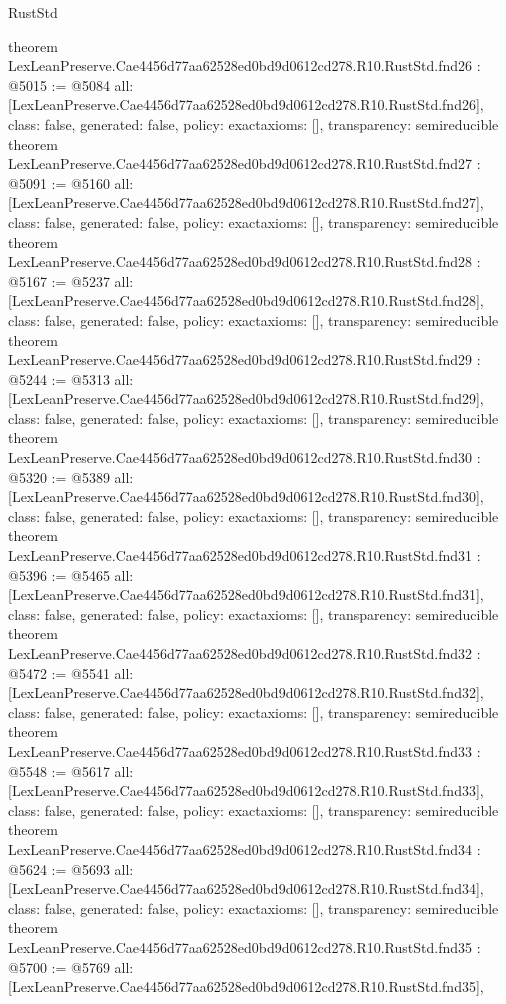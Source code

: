 \begin{lexlean}{RustStd}
\begin{coremodule}
{}
theorem LexLeanPreserve.Cae4456d77aa62528ed0bd9d0612cd278.R10.RustStd.fnd26 : @5015 := @5084 {
  all: [LexLeanPreserve.Cae4456d77aa62528ed0bd9d0612cd278.R10.RustStd.fnd26],
  class: false,
  generated: false,
  policy: exact{axioms: []},
  transparency: semireducible
}
theorem LexLeanPreserve.Cae4456d77aa62528ed0bd9d0612cd278.R10.RustStd.fnd27 : @5091 := @5160 {
  all: [LexLeanPreserve.Cae4456d77aa62528ed0bd9d0612cd278.R10.RustStd.fnd27],
  class: false,
  generated: false,
  policy: exact{axioms: []},
  transparency: semireducible
}
theorem LexLeanPreserve.Cae4456d77aa62528ed0bd9d0612cd278.R10.RustStd.fnd28 : @5167 := @5237 {
  all: [LexLeanPreserve.Cae4456d77aa62528ed0bd9d0612cd278.R10.RustStd.fnd28],
  class: false,
  generated: false,
  policy: exact{axioms: []},
  transparency: semireducible
}
theorem LexLeanPreserve.Cae4456d77aa62528ed0bd9d0612cd278.R10.RustStd.fnd29 : @5244 := @5313 {
  all: [LexLeanPreserve.Cae4456d77aa62528ed0bd9d0612cd278.R10.RustStd.fnd29],
  class: false,
  generated: false,
  policy: exact{axioms: []},
  transparency: semireducible
}
theorem LexLeanPreserve.Cae4456d77aa62528ed0bd9d0612cd278.R10.RustStd.fnd30 : @5320 := @5389 {
  all: [LexLeanPreserve.Cae4456d77aa62528ed0bd9d0612cd278.R10.RustStd.fnd30],
  class: false,
  generated: false,
  policy: exact{axioms: []},
  transparency: semireducible
}
theorem LexLeanPreserve.Cae4456d77aa62528ed0bd9d0612cd278.R10.RustStd.fnd31 : @5396 := @5465 {
  all: [LexLeanPreserve.Cae4456d77aa62528ed0bd9d0612cd278.R10.RustStd.fnd31],
  class: false,
  generated: false,
  policy: exact{axioms: []},
  transparency: semireducible
}
theorem LexLeanPreserve.Cae4456d77aa62528ed0bd9d0612cd278.R10.RustStd.fnd32 : @5472 := @5541 {
  all: [LexLeanPreserve.Cae4456d77aa62528ed0bd9d0612cd278.R10.RustStd.fnd32],
  class: false,
  generated: false,
  policy: exact{axioms: []},
  transparency: semireducible
}
theorem LexLeanPreserve.Cae4456d77aa62528ed0bd9d0612cd278.R10.RustStd.fnd33 : @5548 := @5617 {
  all: [LexLeanPreserve.Cae4456d77aa62528ed0bd9d0612cd278.R10.RustStd.fnd33],
  class: false,
  generated: false,
  policy: exact{axioms: []},
  transparency: semireducible
}
theorem LexLeanPreserve.Cae4456d77aa62528ed0bd9d0612cd278.R10.RustStd.fnd34 : @5624 := @5693 {
  all: [LexLeanPreserve.Cae4456d77aa62528ed0bd9d0612cd278.R10.RustStd.fnd34],
  class: false,
  generated: false,
  policy: exact{axioms: []},
  transparency: semireducible
}
theorem LexLeanPreserve.Cae4456d77aa62528ed0bd9d0612cd278.R10.RustStd.fnd35 : @5700 := @5769 {
  all: [LexLeanPreserve.Cae4456d77aa62528ed0bd9d0612cd278.R10.RustStd.fnd35],
}
\end{coremodule}
\end{lexlean}
